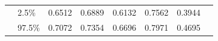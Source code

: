 \begin{table}[H]
\begin{tabular}{@{}llcccccc@{}}
                                         & 2.5\%   & 0.6512 & 0.6889 & 0.6132 & 0.7562 & 0.3944 \\
                                         & 97.5\%  & 0.7072 & 0.7354 & 0.6696 & 0.7971 & 0.4695 \\ \bottomrule
  \end{tabular}    

\end{table}

